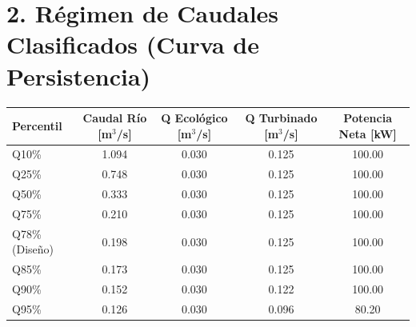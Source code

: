 \documentclass[11pt,a4paper]{article}
\begin{document}
\section*{2. Régimen de Caudales Clasificados (Curva de Persistencia)}
\begin{table}[h!]
\centering
\small
\begin{tabular}{lcccc}
\toprule
\textbf{Percentil} & \textbf{Caudal Río [m$^3$/s]} & \textbf{Q Ecológico [m$^3$/s]} & \textbf{Q Turbinado [m$^3$/s]} & \textbf{Potencia Neta [kW]} \\
\midrule
Q10\% & 1.094 & 0.030 & 0.125 & 100.00 \\
Q25\% & 0.748 & 0.030 & 0.125 & 100.00 \\
Q50\% & 0.333 & 0.030 & 0.125 & 100.00 \\
Q75\% & 0.210 & 0.030 & 0.125 & 100.00 \\
Q78\% (Diseño) & 0.198 & 0.030 & 0.125 & 100.00 \\
Q85\% & 0.173 & 0.030 & 0.125 & 100.00 \\
Q90\% & 0.152 & 0.030 & 0.122 & 100.00 \\
Q95\% & 0.126 & 0.030 & 0.096 & 80.20 \\
\bottomrule
\end{tabular}
\end{table}
\end{document}
